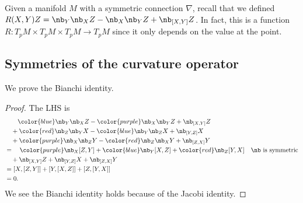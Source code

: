 Given a manifold $M$ with a symmetric connection $\nabla$, recall that we defined $R(X,Y)Z=\nb_Y\nb_XZ-\nb_X\nb_Y Z+\nb_{[X,Y]}Z$. In fact, this is a function $R:T_pM\times T_pM\times T_pM\to T_pM$ since it only depends on the value at the point.

\subsection{Symmetries of the curvature operator}
We prove the Bianchi identity.
\begin{proof}
The LHS is
\begin{align*}
&\qquad{\color{blue}\nb_Y\nb_XZ}-{\color{purple} \nb_X\nb_YZ}+\nb_{[X,Y]}Z\\
&\quad+{\color{red}\nb_Z\nb_YX}-{\color{blue}\nb_Y\nb_ZX}+\nb_{[Y,Z]}X\\
&\quad+{\color{purple}\nb_X\nb_ZY}-{\color{red}\nb_Z\nb_X Y}+\nb_{[Z,X]}Y\\
&=\quad {\color{purple}\nb_X[Z,Y]} +{\color{blue}\nb_Y [X,Z]}+{\color{red}\nb_Z[Y,X]}& \text{$\nb$ is symmetric}\\
&\quad+\nb_{[X,Y]}Z+\nb_{[Y,Z]}X+\nb_{[Z,X]}Y\\
&=[X,[Z,Y]]+[Y,[X,Z]]+[Z,[Y,X]]\\
&=0.
\end{align*}
We see the Bianchi identity holds because of the Jacobi identity. 
\end{proof}

